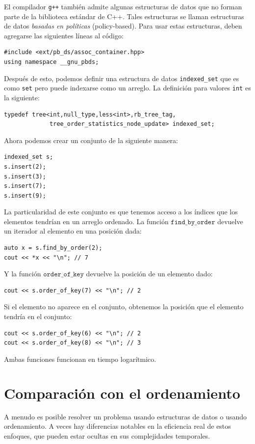El compilador \texttt{g++} también admite
algunas estructuras de datos que no forman parte
de la biblioteca estándar de C++.
Tales estructuras se llaman estructuras de datos
\emph{basadas en políticas} (policy-based).
Para usar estas estructuras, deben agregarse las siguientes líneas
al código:
\begin{lstlisting}
#include <ext/pb_ds/assoc_container.hpp>
using namespace __gnu_pbds;
\end{lstlisting}
Después de esto, podemos definir una estructura de datos \texttt{indexed\_set} que
es como \texttt{set} pero puede indexarse como un arreglo.
La definición para valores \texttt{int} es la siguiente:
\begin{lstlisting}
typedef tree<int,null_type,less<int>,rb_tree_tag,
             tree_order_statistics_node_update> indexed_set;
\end{lstlisting}
Ahora podemos crear un conjunto de la siguiente manera:
\begin{lstlisting}
indexed_set s;
s.insert(2);
s.insert(3);
s.insert(7);
s.insert(9);
\end{lstlisting}
La particularidad de este conjunto es que tenemos acceso a
los índices que los elementos tendrían en un arreglo ordenado.
La función $\texttt{find\_by\_order}$ devuelve
un iterador al elemento en una posición dada:
\begin{lstlisting}
auto x = s.find_by_order(2);
cout << *x << "\n"; // 7
\end{lstlisting}
Y la función $\texttt{order\_of\_key}$
devuelve la posición de un elemento dado:
\begin{lstlisting}
cout << s.order_of_key(7) << "\n"; // 2
\end{lstlisting}
Si el elemento no aparece en el conjunto,
obtenemos la posición que el elemento tendría
en el conjunto:
\begin{lstlisting}
cout << s.order_of_key(6) << "\n"; // 2
cout << s.order_of_key(8) << "\n"; // 3
\end{lstlisting}
Ambas funciones funcionan en tiempo logarítmico.

\section{Comparación con el ordenamiento}

A menudo es posible resolver un problema
usando estructuras de datos o usando ordenamiento.
A veces hay diferencias notables
en la eficiencia real de estos enfoques,
que pueden estar ocultas en sus complejidades temporales.

